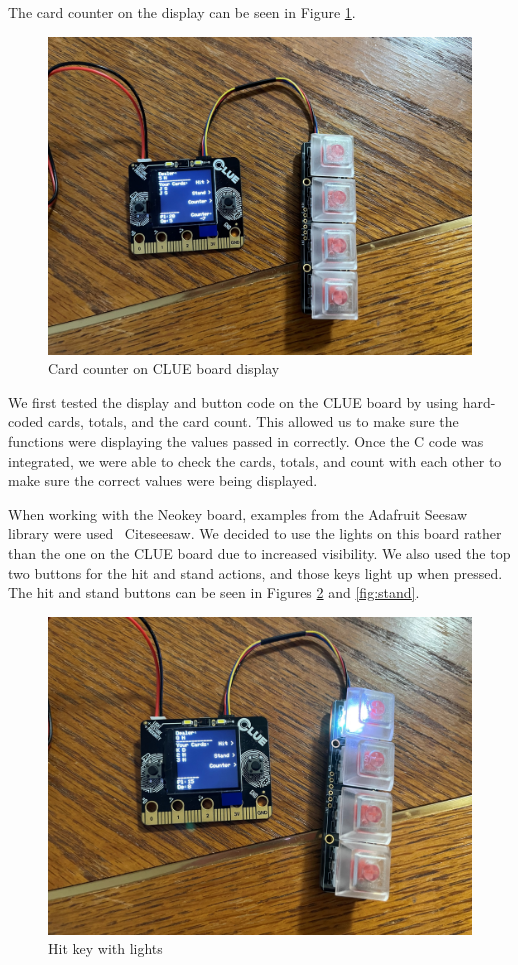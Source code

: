 \documentclass[12pt]{article}
\begin{document}
The card counter on the display can be seen in Figure \ref{fig:counter}.
\begin{figure}[ht]
  \centering
  \includegraphics[width=6in]{counter.jpg}
  \caption{Card counter on CLUE board display}
  \label{fig:counter}
  \end{figure}

We first tested the display and button code on the CLUE board by using hard-coded cards, totals, and the card count. This allowed us to make sure the functions were displaying the values passed in correctly. Once the C code was integrated, we were able to check the cards, totals, and count with each other to make sure the correct values were being displayed.

When working with the Neokey board, examples from the Adafruit Seesaw library were used \
Cite{seesaw}. We decided to use the lights on this board rather than the one on the CLUE board due to increased visibility. We also used the top two buttons for the hit and stand actions, and those keys light up when pressed. The hit and stand buttons can be seen in Figures \ref{fig:hit} and \ref{fig:stand}.
\begin{figure}[ht]
  \centering
  \includegraphics[width=6in]{hit.jpg}
  \caption{Hit key with lights}
  \label{fig:hit}
  \end{figure}
\end{document}
